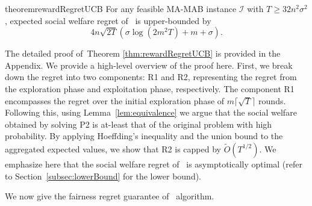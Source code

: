 \begin{restatable}{theorem}{rewardRegretUCB}
\label{thm:rewardRegretUCB}
For any feasible MA-MAB instance $\mathcal{I}$ with   $T\geq 32n^2\sigma^2$,     expected social welfare regret of \ouralgo \ is upper-bounded by $$ 4n \sqrt{2T}\left(\sigma\log{(2m^2T)} +m + \sigma \right).  $$
    
\end{restatable}

The detailed proof of~Theorem \ref{thm:rewardRegretUCB} is provided in the Appendix. We provide a high-level overview of the proof here.  First, we break down the regret into two components: R1 and R2, representing the regret from the exploration phase and exploitation phase, respectively. The component R1 encompasses the regret over the initial exploration phase of  $m\lceil \sqrt{T} \rceil$ rounds. Following this, using      Lemma~\ref{lem:equivalence} we  argue that the social welfare obtained by solving P2 is at-least that of the original problem with high probability. By applying Hoeffding's inequality and the union bound to the aggregated expected values, we show that R2 is capped by $\tilde{O}(T^{1/2})$. 
 We emphasize here that the social welfare regret  of \ouralgo\ is asymptotically optimal (refer to Section~\ref{subsec:lowerBound} for the lower bound). 

We now give the fairness regret guarantee of \ouralgo\ algorithm. 


